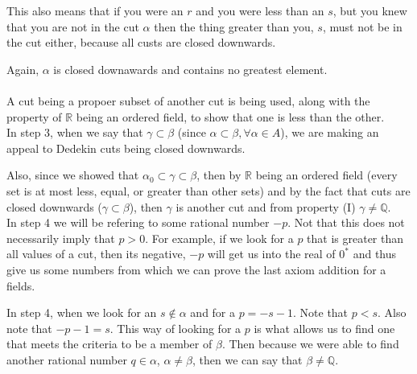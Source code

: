 This also means that if you were an $r$ and you were less than an $s$, but you knew that
you are not in the cut $\alpha$ then the thing greater than you, $s$, must not be in the cut either,
because all custs are closed downwards.

Again, $\alpha$ is closed downawards and contains no greatest element.
\\~\\

A cut being a propoer subset of another cut is being used, along with the property of $\mathbb{R}$
being an ordered field, to show that one is less than the other.
\\

In step 3, when we say that $\gamma \subset \beta$
(since $\alpha \subset \beta, \forall \alpha\in A$),
we are making an appeal to Dedekin cuts being closed downwards.

Also, since we showed that $\alpha_0 \subset \gamma \subset \beta$,
then by $\mathbb{R}$ being an ordered field (every set is at most less, equal, or greater than other sets)
and by the fact that cuts are closed downwards ($\gamma \subset \beta$),
then $\gamma$ is another cut and from property (I) $\gamma \neq \mathbb{Q}$.
\\

In step 4 we will be refering to some rational number $-p$.
Not that this does not necessarily imply that $p>0$. For example,
if we look for a $p$ that is greater than all values of a cut, then its negative, $-p$
will get us into the real of $0^*$ and thus give us some numbers from which we can prove the
last axiom addition for a fields.

In step 4, when we look for an $s\notin \alpha$ and for a $p=-s-1$.
Note that $p<s$.
Also note that $-p -1 = s$.
This way of looking for a $p$ is what allows us to find one that meets the criteria to be a
member of $\beta$.
Then because we were able to find another rational number $q\in\alpha$, $\alpha \neq \beta$,
then we can say that $\beta \neq \mathbb{Q}$.
\\